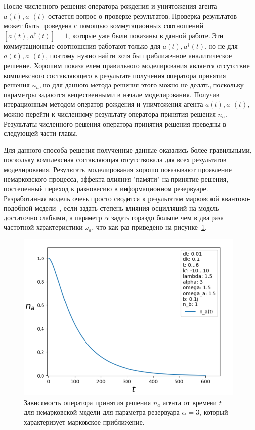 После численного решения оператора рождения и уничтожения агента $a(t), a^{\dagger}(t)$ остается
вопрос о проверке результатов.
Проверка результатов может быть проведена с помощью коммутационных соотношений $[a(t), a^{\dagger}(t)] = 1$,
которые уже были показаны в данной работе.
Эти коммутационные соотношения работают только для $a(t), a^{\dagger}(t)$, но не для
$\dot{a}(t), \dot{a}^{\dagger}(t)$, поэтому нужно найти хотя бы приближенное аналитическое решение.
Хорошим показателем правильного моделирования является отсутствие комплексного составляющего в результате
получения оператора принятия решения $n_{a}$, но для данного метода решения этого можно не делать,
поскольку параметры задаются вещественными в начале моделирования.
Получив итерационным методом оператор рождения и уничтожения агента $a(t), a^{\dagger}(t)$, можно
перейти к численному результату оператора принятия решения $n_{a}$.
Результаты численного решения оператора принятия решения преведны в следующей части главы.


Для данного способа решения полученные данные оказались более правильными, поскольку комплексная составляющая
отсутствовала для всех результатов моделирования.
Результаты моделирования хорошо показывают проявление немарковского процесса, эффекта влияния "памяти"
на принятие решения, постепенный переход к равновесию в информационном резервуаре.
Разработанная модель очень просто сводится к результатам марковской квантово-подобной модели~\citep{bagarello2018quantum},
если задать степень влияния осцилляций на модель достаточно слабыми, а параметр $\alpha$ задать гораздо
больше чем в два раза частотной характеристики $\omega_{a}$, что как раз приведено на рисунке~\ref{fig:sr_mark}.
\newpage
\begin{figure}[h!]
    \centering
    \captionsetup{justification=centering}
    \includegraphics[width=0.7\linewidth]{pictures/result_second_1.png}
    \caption{Зависимость оператора принятия решения $n_{a}$ агента от времени $t$ для немарковской модели
    для параметра резервуара $\alpha = 3$, который характеризует марковское приближение.}
    \label{fig:sr_mark}
\end{figure}

